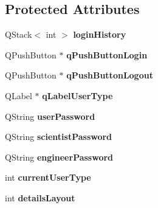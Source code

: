 \subsection*{Protected Attributes}
\begin{DoxyCompactItemize}
\item 
\hypertarget{classQELogin_ac7d727ef13a9e1eec80a48f54c902a6c}{
QStack$<$ int $>$ {\bfseries loginHistory}}
\label{classQELogin_ac7d727ef13a9e1eec80a48f54c902a6c}

\item 
\hypertarget{classQELogin_a7e21b962c87c70b7533910472d0100ef}{
QPushButton $\ast$ {\bfseries qPushButtonLogin}}
\label{classQELogin_a7e21b962c87c70b7533910472d0100ef}

\item 
\hypertarget{classQELogin_ae7ade17f086d04d0b5bb1ef35dbc041b}{
QPushButton $\ast$ {\bfseries qPushButtonLogout}}
\label{classQELogin_ae7ade17f086d04d0b5bb1ef35dbc041b}

\item 
\hypertarget{classQELogin_a40d6529625f86de8c2c4edf069522992}{
QLabel $\ast$ {\bfseries qLabelUserType}}
\label{classQELogin_a40d6529625f86de8c2c4edf069522992}

\item 
\hypertarget{classQELogin_ae0ae55a4c3a19f20898b32bc4ef3df33}{
QString {\bfseries userPassword}}
\label{classQELogin_ae0ae55a4c3a19f20898b32bc4ef3df33}

\item 
\hypertarget{classQELogin_a48ac49245c600c3dbb9a0d052aafac26}{
QString {\bfseries scientistPassword}}
\label{classQELogin_a48ac49245c600c3dbb9a0d052aafac26}

\item 
\hypertarget{classQELogin_aee316604b82dabea914c7b084a1cb7a7}{
QString {\bfseries engineerPassword}}
\label{classQELogin_aee316604b82dabea914c7b084a1cb7a7}

\item 
\hypertarget{classQELogin_a11868fca0c9c3bc050377b1b1a36f34b}{
int {\bfseries currentUserType}}
\label{classQELogin_a11868fca0c9c3bc050377b1b1a36f34b}

\item 
\hypertarget{classQELogin_abfba9ddff05d536f6db0b36696fbe99f}{
int {\bfseries detailsLayout}}
\label{classQELogin_abfba9ddff05d536f6db0b36696fbe99f}

\end{DoxyCompactItemize}
